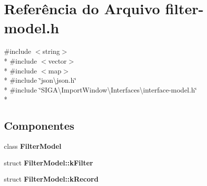 \section{Referência do Arquivo filter-\/model.h}
\label{filter-model_8h}
{\ttfamily \#include $<$string$>$}\\*
{\ttfamily \#include $<$vector$>$}\\*
{\ttfamily \#include $<$map$>$}\\*
{\ttfamily \#include \char`\"{}json\textbackslash{}json.\+h\char`\"{}}\\*
{\ttfamily \#include \char`\"{}S\+I\+G\+A\textbackslash{}\+Import\+Window\textbackslash{}\+Interfaces\textbackslash{}interface-\/model.\+h\char`\"{}}\\*
\subsection*{Componentes}
\begin{DoxyCompactItemize}
\item 
class {\bf Filter\+Model}
\item 
struct {\bf Filter\+Model\+::k\+Filter}
\item 
struct {\bf Filter\+Model\+::k\+Record}
\end{DoxyCompactItemize}
